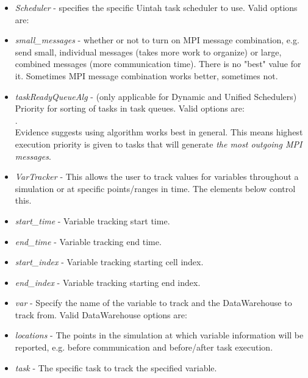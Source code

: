 \begin{itemize}
  \item \emph{Scheduler} - specifies the specific Uintah task scheduler to
      use.
      Valid options are: 
  \item \emph{small\_messages} - whether or not to turn on MPI message
      combination, e.g. send small, individual messages (takes more work to
      organize) or large, combined messages (more communication time). There
      is no "best" value for it. Sometimes MPI message combination works
      better, sometimes not.
  \item \emph{taskReadyQueueAlg} - (only applicable for Dynamic and Unified
      Schedulers) Priority for sorting of tasks in task queues. Valid
      options are: \\
      . \\
      Evidence suggests using  algorithm works best in general. This means highest execution priority is given to
      tasks that will generate \emph{the most outgoing MPI messages}.
  \item \emph{VarTracker} - This allows the user to track values for
      variables throughout a simulation or at specific points/ranges in
      time. The elements below control this.
  \vspace{-5pt}
  \item \emph{start\_time} - Variable tracking start time.
  \vspace{-5pt}
  \item \emph{end\_time} - Variable tracking end time.
  \vspace{-5pt}
  \item \emph{start\_index} - Variable tracking starting cell index.
  \vspace{-5pt}
  \item \emph{end\_index} - Variable tracking starting end index.
  \vspace{-5pt}
  \item \emph{var} - Specify the name of the variable to track and the
      DataWarehouse to track from. Valid DataWarehouse options are:
  \vspace{-5pt}
  \item \emph{locations} - The points in the simulation at which variable
      information will be reported, e.g. before communication and
      before/after task execution.
  \vspace{-5pt}
  \item \emph{task} - The specific task to track the specified variable.
\end{itemize}

